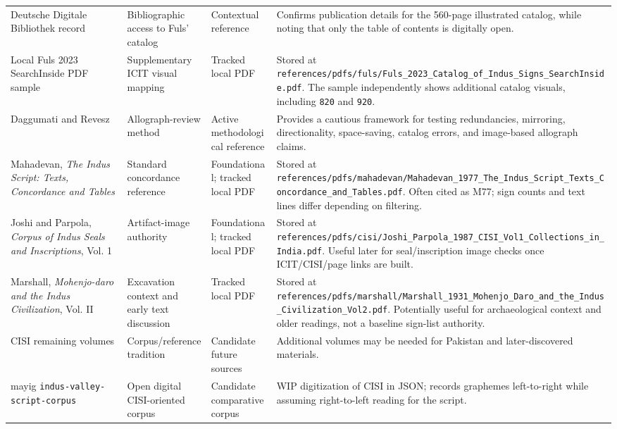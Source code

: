 \begin{longtable}{p{}p{}p{}p{}}
Deutsche Digitale Bibliothek record \citep{ddbFulsCatalog2026} & Bibliographic access to Fuls' catalog & Contextual reference & Confirms publication details for the 560-page illustrated catalog, while noting that only the table of contents is digitally open. \\
Local Fuls 2023 SearchInside PDF sample & Supplementary ICIT visual mapping & Tracked local PDF & Stored at \texttt{references/pdfs/fuls/Fuls\_2023\_Catalog\_of\_Indus\_Signs\_SearchInside.pdf}. The sample independently shows additional catalog visuals, including \texttt{820} and \texttt{920}. \\
Daggumati and Revesz \citep{daggumati2021allographs} & Allograph-review method & Active methodological reference & Provides a cautious framework for testing redundancies, mirroring, directionality, space-saving, catalog errors, and image-based allograph claims. \\
Mahadevan, \emph{The Indus Script: Texts, Concordance and Tables} \citep{mahadevan1977} & Standard concordance reference & Foundational; tracked local PDF & Stored at \texttt{references/pdfs/mahadevan/Mahadevan\_1977\_The\_Indus\_Script\_Texts\_Concordance\_and\_Tables.pdf}. Often cited as M77; sign counts and text lines differ depending on filtering. \\
Joshi and Parpola, \emph{Corpus of Indus Seals and Inscriptions}, Vol. 1 \citep{joshiParpola1987cisi1} & Artifact-image authority & Foundational; tracked local PDF & Stored at \texttt{references/pdfs/cisi/Joshi\_Parpola\_1987\_CISI\_Vol1\_Collections\_in\_India.pdf}. Useful later for seal/inscription image checks once ICIT/CISI/page links are built. \\
Marshall, \emph{Mohenjo-daro and the Indus Civilization}, Vol. II \citep{marshall1931mohenjodaro2} & Excavation context and early text discussion & Tracked local PDF & Stored at \texttt{references/pdfs/marshall/Marshall\_1931\_Mohenjo\_Daro\_and\_the\_Indus\_Civilization\_Vol2.pdf}. Potentially useful for archaeological context and older readings, not a baseline sign-list authority. \\
CISI remaining volumes & Corpus/reference tradition & Candidate future sources & Additional volumes may be needed for Pakistan and later-discovered materials. \\
mayig \texttt{indus-valley-script-corpus} & Open digital CISI-oriented corpus & Candidate comparative corpus & WIP digitization of CISI in JSON; records graphemes left-to-right while assuming right-to-left reading for the script. \\

\end{longtable}
